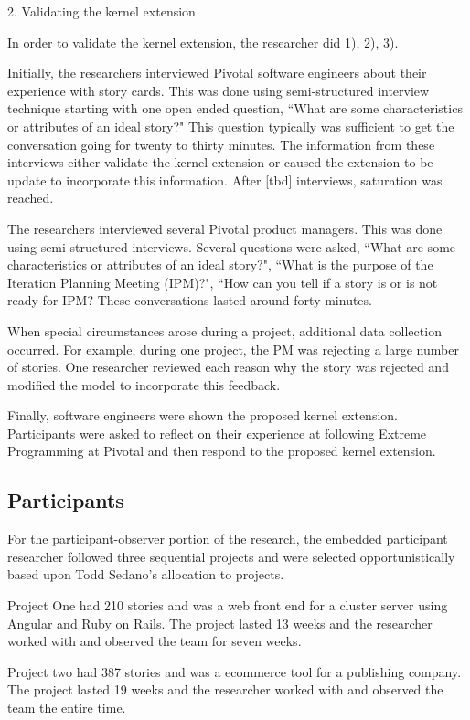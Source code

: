 \documentclass[preprint,12pt,3p]{elsarticle}
\begin{document}
2. Validating the kernel extension

In order to validate the kernel extension, the researcher did 1), 2), 3).

Initially, the researchers interviewed Pivotal software engineers about their experience with story cards. This was done using semi-structured interview technique starting with one open ended question, ``What are some characteristics or attributes of an ideal story?" This question typically was sufficient to get the conversation going for twenty to thirty minutes. The information from these interviews either validate the kernel extension or caused the extension to be update to incorporate this information. After [tbd] interviews, saturation was reached.

The researchers interviewed several Pivotal product managers. This was done using semi-structured interviews. Several questions were asked, ``What are some characteristics or attributes of an ideal story?", ``What is the purpose of the Iteration Planning Meeting (IPM)?", ``How can you tell if a story is or is not ready for IPM? These conversations lasted around forty minutes. 

When special circumstances arose during a project, additional data collection occurred. For example, during one project, the PM was rejecting a large number of stories. One researcher reviewed each reason why the story was rejected and modified the model to incorporate this feedback.

Finally, software engineers were shown the proposed kernel extension. Participants were asked to reflect on their experience at following Extreme Programming at Pivotal and then respond to the proposed kernel extension.

\subsection{Participants}
For the participant-observer portion of the research, the embedded participant researcher followed three sequential projects and were selected opportunistically based upon Todd Sedano's allocation to projects. 

Project One had 210 stories and was a web front end for a cluster server using Angular and Ruby on Rails. The project lasted 13 weeks and the researcher worked with and observed the team for seven weeks. 

Project two had 387 stories and was a ecommerce tool for a publishing company. The project lasted 19 weeks and the researcher worked with and observed the team the entire time.
\end{document}
